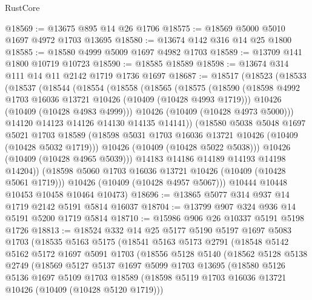 \begin{lexlean}{RustCore}
\begin{coremodule}
@18569 := @13675 @895 @14 @26 @1706
@18575 := @18569 @5000 @5010 @1697 @4972 @1703 @13695
@18580 := @13674 @142 @316 @14 @25 @1800
@18585 := @18580 @4999 @5009 @1697 @4982 @1703
@18589 := @13709 @141 @1800 @10719 @10723
@18590 := @18585 @18589
@18598 := @13674 @314 @111 @14 @11 @2142 @1719 @1736 @1697
@18687 := @18517
    (@18523
      (@18533
        (@18537
          (@18544
            (@18554
              (@18558
                (@18565
                  (@18575
                    (@18590
                      (@18598 @4992 @1703 @16036 @13721 @10426 (@10409 (@10428 @4993 @1719)))
                      @10426
                      (@10409 (@10428 @4983 @4999)))
                    @10426
                    (@10409 (@10428 @4973 @5000)))
                  @14120
                  @14123
                  @14126
                  @14130
                  @14135
                  @14141))
              (@18580
                @5038
                @5048
                @1697
                @5021
                @1703
                @18589
                (@18598 @5031 @1703 @16036 @13721 @10426 (@10409 (@10428 @5032 @1719)))
                @10426
                (@10409 (@10428 @5022 @5038)))
              @10426
              (@10409 (@10428 @4965 @5039)))
            @14183
            @14186
            @14189
            @14193
            @14198
            @14204))
        (@18598 @5060 @1703 @16036 @13721 @10426 (@10409 (@10428 @5061 @1719)))
        @10426
        (@10409 (@10428 @4957 @5067)))
      @10444
      @10448
      @10453
      @10458
      @10464
      @10473)
@18696 := @13865 @5077 @314 @937 @14 @1719 @2142 @5191 @5814 @16037
@18704 := @13799 @907 @324 @936 @14 @5191 @5200 @1719 @5814
@18710 := @15986 @906 @26 @10337 @5191 @5198 @1726
@18813 := @18524
    @332
    @14
    @25
    @5177
    @5190
    @5197
    @1697
    @5083
    @1703
    (@18535
      @5163
      @5175
      (@18541
        @5163
        @5173
        @2791
        (@18548
          @5142
          @5162
          @5172
          @1697
          @5091
          @1703
          (@18556
            @5128
            @5140
            (@18562
              @5128
              @5138
              @2749
              (@18569
                @5127
                @5137
                @1697
                @5099
                @1703
                @13695
                (@18580
                  @5126
                  @5136
                  @1697
                  @5109
                  @1703
                  @18589
                  (@18598 @5119 @1703 @16036 @13721 @10426 (@10409 (@10428 @5120 @1719)))

\end{coremodule}
\end{lexlean}
